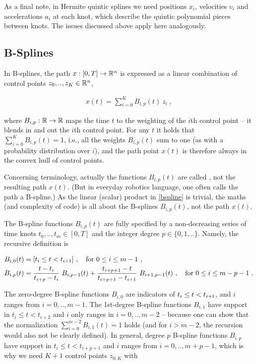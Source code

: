 As a final note, in Hermite quintic splines we need positions $x_i$, velocities $v_i$ and accelerations $a_i$ at each knot, which describe the quintic polynomial pieces between knots. The issues discussed above apply here analogously.

\subsection{B-Splines}

In B-splines, the path $x: [0,T] \to {\mathbb{R}}^n$ is expressed as a linear combination of control points $z_0,.., z_K \in {\mathbb{R}}^n$,

\begin{align}\label{bspline}
x(t) = \sum_{i=0}^K B_{i,p}(t)~ z_i ~,
\end{align}

where $B_{i,p}: {\mathbb{R}} \to {\mathbb{R}}$ maps the time $t$ to the weighting of the $i$th control point -- it blends in and out the $i$th control point. For any $t$ it  holds that $\sum_{i=0}^K B_{i,p}(t) = 1$, i.e., all the weights $B_{i,p}(t)$ sum to one (as with a probability distribution over $i$), and the path point $x(t)$ is therefore always in the convex hull of control points.

Concerning terminology, actually the functions $B_{i,p}(t)$ are called , not the resulting path $x(t)$. (But in everyday robotics language, one often calls the path a B-spline.) As the linear (scalar) product in \eqref{bspline} is trivial, the maths (and complexity of code) is all about the B-splines $B_{i,p}(t)$, not the path $x(t)$.

The B-spline functions $B_{i,p}(t)$ are fully specified by a non-decreasing series of time knots $t_0,..,t_m \in [0,T]$ and the integer degree $p\in\{0,1,..\}$. Namely, the recursive definition is

\begin{align}
B_{i,0}(t) &= [t_i \le t < t_{i{{\hspace*{-.0pt}\text{\rm +}\hspace*{-.5pt}}1}}] ~,\quad \text{for $0\le i \le m-1$} ~,\\
B_{i,p}(t)
&= \frac{t-t_i}{t_{i+p}-t_i}~ B_{i,p-1}(t)
 +  \frac{t_{i+p+1}-t}{t_{i+p+1}-t_{i+1}}~ B_{i+1,p-1}(t)  ~,\quad \text{for $0\le i \le m-p-1$} ~.
\end{align}


The zero-degree B-spline functions $B_{i,0}$ are indicators of $t_i \le t < t_{i{{\hspace*{-.0pt}\text{\rm +}\hspace*{-.5pt}}1}}$, and $i$ ranges from $i=0,..,m-1$. The 1st-degree B-spline functions $B_{i,1}$ have support in $t_i \le t < t_{i+2}$ and $i$ only ranges in
$i=0,..,m-2$ -- because one can show that the normalization $\sum_{i=0}^{m-2} B_{i,1}(t) = 1$ holds (and for $i>m-2$, the recursion would also not be clearly defined). In general, degree $p$ B-spline functions $B_{i,p}$ have support in $t_i \le t < t_{i+p+1}$ and $i$ ranges from $i=0,..,m+p-1$, which is why we need $K+1$ control points $z_{0:K}$ with

